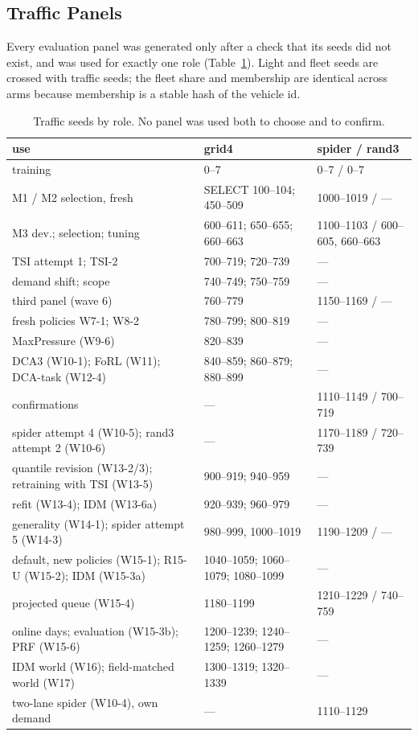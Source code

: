\subsection{Traffic Panels}
Every evaluation panel was generated only after a check that its seeds did not exist, and was used for exactly one role
(Table~\ref{tab:panels}). Light and fleet seeds are crossed with traffic seeds; the fleet share and membership are identical across arms
because membership is a stable hash of the vehicle id.
\begin{table}[t]\centering\footnotesize\setlength{\tabcolsep}{2.5pt}
\caption{Traffic seeds by role. No panel was used both to choose and to confirm.}\label{tab:panels}\scriptsize
\begin{tabular}{@{}p{2.45cm}p{2.75cm}p{2.95cm}@{}}\toprule
use & grid4 & spider / rand3\\\midrule
training & 0--7 & 0--7 / 0--7\\
M1 / M2 selection, fresh & SELECT 100--104; 450--509 & 1000--1019 / ---\\
M3 dev.; selection; tuning & 600--611; 650--655; 660--663 & 1100--1103 / 600--605, 660--663\\
TSI attempt 1; TSI-2 & 700--719; 720--739 & ---\\
demand shift; scope & 740--749; 750--759 & ---\\
third panel (wave 6) & 760--779 & 1150--1169 / ---\\
fresh policies W7-1; W8-2 & 780--799; 800--819 & ---\\
MaxPressure (W9-6) & 820--839 & ---\\
DCA3 (W10-1); FoRL (W11); DCA-task (W12-4) & 840--859; 860--879; 880--899 & ---\\
confirmations & --- & 1110--1149 / 700--719\\
spider attempt 4 (W10-5); rand3 attempt 2 (W10-6) & --- & 1170--1189 / 720--739\\
quantile revision (W13-2/3); retraining with TSI (W13-5) & 900--919; 940--959 & ---\\
refit (W13-4); IDM (W13-6a) & 920--939; 960--979 & ---\\
generality (W14-1); spider attempt 5 (W14-3) & 980--999, 1000--1019 & 1190--1209 / ---\\
default, new policies (W15-1); R15-U (W15-2); IDM (W15-3a) & 1040--1059; 1060--1079; 1080--1099 & ---\\
projected queue (W15-4) & 1180--1199 & 1210--1229 / 740--759\\
online days; evaluation (W15-3b); PRF (W15-6) & 1200--1239; 1240--1259; 1260--1279 & ---\\
IDM world (W16); field-matched world (W17) & 1300--1319; 1320--1339 & ---\\
two-lane spider (W10-4), own demand & --- & 1110--1129\\\bottomrule
\end{tabular}\end{table}

